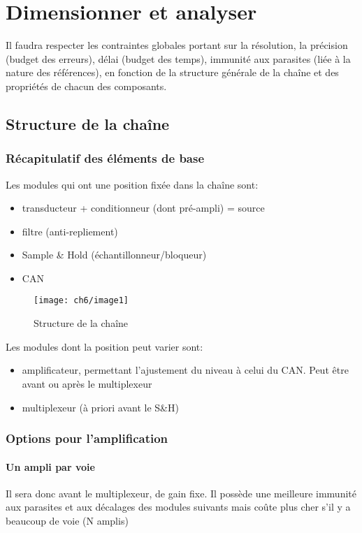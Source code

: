 \chapter{Dimensionner et analyser}
Il faudra respecter les contraintes globales portant sur la résolution, la précision (budget des erreurs), délai (budget des temps), immunité aux parasites (liée à la nature des références), en fonction de la structure générale de la chaîne et des propriétés de chacun des composants.
\section{Structure de la chaîne}
\subsection{Récapitulatif des éléments de base}
Les modules qui ont une position fixée dans la chaîne sont:
\begin{itemize}
	\item transducteur + conditionneur (dont pré-ampli) = source
	\item filtre (anti-repliement)
	\item Sample \& Hold (échantillonneur/bloqueur)
	\item CAN
\end{itemize}
\begin{figure}[H] 
	\centering 
	\texttt{[image: ch6/image1]} 
	\caption{Structure de la chaîne} 
	\label{fig:strucchain}
\end{figure}
Les modules dont la position peut varier sont:
\begin{itemize}
	\item amplificateur, permettant l'ajustement du niveau à celui du CAN. Peut être avant ou après le multiplexeur
	\item multiplexeur (à priori avant le S\&H)
\end{itemize}
\subsection{Options pour l'amplification}
\subsubsection{Un ampli par voie}
Il sera donc avant le multiplexeur, de gain fixe. Il possède une meilleure immunité aux parasites et aux décalages des modules suivants mais coûte plus cher s'il y a beaucoup de voie (N amplis)
